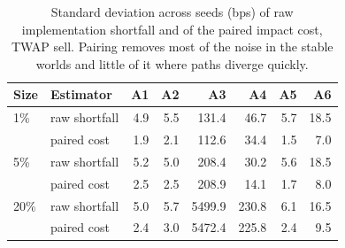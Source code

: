 \begin{table}[!htbp]
\centering\footnotesize
\caption{Standard deviation across seeds (bps) of raw implementation shortfall and of the paired impact cost, TWAP sell. Pairing removes most of the noise in the stable worlds and little of it where paths diverge quickly.}\label{tab:noise}
\begin{tabular}{llrrrrrr}
\toprule
Size & Estimator & A1 & A2 & A3 & A4 & A5 & A6 \\
\midrule
1\% & raw shortfall & 4.9 & 5.5 & 131.4 & 46.7 & 5.7 & 18.5 \\
 & paired cost & 1.9 & 2.1 & 112.6 & 34.4 & 1.5 & 7.0 \\
5\% & raw shortfall & 5.2 & 5.0 & 208.4 & 30.2 & 5.6 & 18.5 \\
 & paired cost & 2.5 & 2.5 & 208.9 & 14.1 & 1.7 & 8.0 \\
20\% & raw shortfall & 5.0 & 5.7 & 5499.9 & 230.8 & 6.1 & 16.5 \\
 & paired cost & 2.4 & 3.0 & 5472.4 & 225.8 & 2.4 & 9.5 \\
\bottomrule
\end{tabular}
\end{table}
